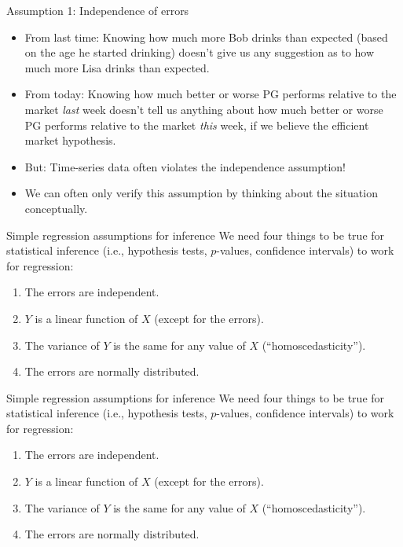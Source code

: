 \documentclass{beamer}\usepackage[]{graphicx}\usepackage[]{color}
\begin{document}
\begin{darkframes}
    \begin{frame}{Assumption 1: Independence of errors}
      \begin{itemize}[<+->]
        \item From last time: Knowing how much more Bob drinks than expected (based on the age he started drinking) doesn't give us any suggestion as to how much more Lisa drinks than expected.
        \item From today: Knowing how much better or worse PG performs relative to the market \emph{last} week doesn't tell us anything about how much better or worse PG performs relative to the market \emph{this} week, if we believe the efficient market hypothesis.
        \item \alert{But:} Time-series data often violates the independence assumption!
        \item We can often only verify this assumption by thinking about the situation conceptually.
      \end{itemize}
    \end{frame}

    \begin{frame}{Simple regression assumptions for inference}
      We need four things to be true for statistical inference (i.e., hypothesis tests, $p$-values, confidence intervals) to work for regression:
      \begin{enumerate}
        \item The errors are independent. \greencheckmark
        \item $Y$ is a linear function of $X$ (except for the errors).
        \item The variance of $Y$ is the same for any value of $X$ (``homoscedasticity'').
        \item The errors are normally distributed.
      \end{enumerate}
    \end{frame}


    \begin{frame}{Simple regression assumptions for inference}
      We need four things to be true for statistical inference (i.e., hypothesis tests, $p$-values, confidence intervals) to work for regression:
      \begin{enumerate}
        \item The errors are independent. \greencheckmark
        \item $Y$ is a linear function of $X$ (except for the errors). \greencheckmark
        \item The variance of $Y$ is the same for any value of $X$ (``homoscedasticity''). \greencheckmark
        \item The errors are normally distributed.
      \end{enumerate}
    \end{frame}


\end{darkframes}
\end{document}
